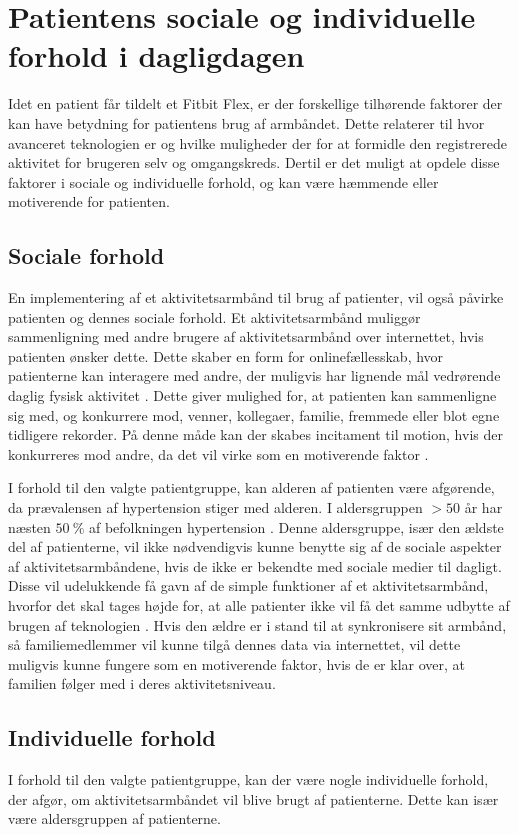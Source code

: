 \section{Patientens sociale og individuelle forhold i dagligdagen}
Idet en patient får tildelt et Fitbit Flex, er der forskellige tilhørende faktorer der kan have betydning for patientens brug af armbåndet. 
Dette relaterer til hvor avanceret teknologien er og hvilke muligheder der for at formidle den registrerede aktivitet for brugeren selv og omgangskreds. Dertil er det muligt at opdele  disse faktorer i sociale og individuelle forhold, og kan være hæmmende eller motiverende for patienten.   

\subsection{Sociale forhold}
En implementering af et aktivitetsarmbånd til brug af patienter, vil også påvirke patienten og dennes sociale forhold. Et aktivitetsarmbånd muliggør sammenligning med andre brugere af aktivitetsarmbånd over internettet, hvis patienten ønsker dette. Dette skaber en form for onlinefællesskab, hvor patienterne kan interagere med andre, der muligvis har lignende mål vedrørende daglig fysisk aktivitet \citep{karapanos2016}. 
Dette giver mulighed for, at patienten kan sammenligne sig med, og konkurrere mod, venner, kollegaer, familie, fremmede eller blot egne tidligere rekorder. På denne måde kan der skabes incitament til motion, hvis der konkurreres mod andre, da det vil virke som en motiverende faktor \citep{rooksby2014}.

I forhold til den valgte patientgruppe, kan alderen af patienten være afgørende, da prævalensen af hypertension stiger med alderen. I aldersgruppen $>50$ år har næsten $50~\%$ af befolkningen hypertension \citep{kronborg2008}. Denne aldersgruppe, især den ældste del af patienterne, vil ikke nødvendigvis kunne benytte sig af de sociale aspekter af aktivitetsarmbåndene, hvis de ikke er bekendte med sociale medier til dagligt. Disse vil udelukkende få gavn af de simple funktioner af et aktivitetsarmbånd, hvorfor det skal tages højde for, at alle patienter ikke vil få det samme udbytte af brugen af teknologien \citep{mercer2016}. Hvis den ældre er i stand til at synkronisere sit armbånd, så familiemedlemmer vil kunne tilgå dennes data via internettet, vil dette muligvis kunne fungere som en motiverende faktor, hvis de er klar over, at familien følger med i deres aktivitetsniveau.

\subsection{Individuelle forhold}
I forhold til den valgte patientgruppe, kan der være nogle individuelle forhold, der afgør, om aktivitetsarmbåndet vil blive brugt af patienterne. Dette kan især være aldersgruppen af patienterne. 

